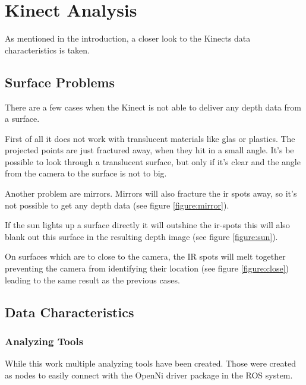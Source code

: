 \chapter{Kinect Analysis}
\graphicspath{{./KinectData/img/}}

As mentioned in the introduction, a closer look to the Kinects data characteristics is taken.


\section{Surface Problems}

There are a few cases when the Kinect is not able to deliver any depth data from a surface.

First of all it does not work with translucent materials like glas or plastics. The projected
points are just fractured away, when they hit in a small angle. It's be possible to look through 
a translucent surface, but only if it's clear and the angle from the camera to the surface is not
to big.

Another problem are mirrors. Mirrors will also fracture the ir spots away, 
so it's not possible to get any depth data (see figure \vref{figure:mirror}).

If the sun lights up a surface directly it will outshine the ir-spots this will also blank out this surface
in the resulting depth image (see figure \vref{figure:sun}).

On surfaces which are to close to the camera, the IR spots will melt together preventing the camera from
identifying their location (see figure \vref{figure:close}) leading to the same result as the previous cases.


\section{Data Characteristics} 

\subsection{Analyzing Tools}

While this work multiple analyzing tools have been created. Those were created as
nodes to easily connect with the OpenNi driver package in the ROS system.

